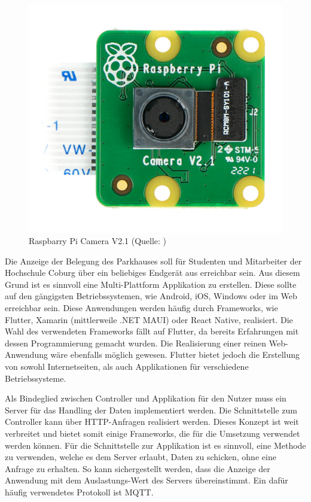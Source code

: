 \begin{figure}[h]
	\myImagePos{}
	\includegraphics[width=0.4\myImageWidth]{Bilder/piCam.jpg}
	\caption[Raspberry Pi Camera V2.1]{Raspbarry Pi Camera V2.1 (Quelle: \cite{PiCamPIC})}
	\label{fig:PiCAM}
\end{figure}

Die Anzeige der Belegung des Parkhauses soll für Studenten und Mitarbeiter der Hochschule Coburg über ein beliebiges Endgerät aus erreichbar sein.
Aus diesem Grund ist es sinnvoll eine Multi-Plattform Applikation zu erstellen.
Diese sollte auf den gängigsten Betriebssystemen, wie Android, iOS, Windows oder im Web erreichbar sein.
Diese Anwendungen werden häufig durch Frameworks, wie Flutter, Xamarin (mittlerweile .NET MAUI) oder React Native, realisiert.
Die Wahl des verwendeten Frameworks fällt auf Flutter, da bereits Erfahrungen mit dessen Programmierung gemacht wurden.
Die Realisierung einer reinen Web-Anwendung wäre ebenfalls möglich gewesen.
Flutter bietet jedoch die Erstellung von sowohl Internetseiten, als auch Applikationen für verschiedene Betriebssysteme.

Als Bindeglied zwischen Controller und Applikation für den Nutzer muss ein Server für das Handling der Daten implementiert werden.
Die Schnittstelle zum Controller kann über HTTP-Anfragen realisiert werden.
Dieses Konzept ist weit verbreitet und bietet somit einige Frameworks, die für die Umsetzung verwendet werden können.
Für die Schnittstelle zur Applikation ist es sinnvoll, eine Methode zu verwenden, welche es dem Server erlaubt, Daten zu schicken, ohne eine Anfrage zu erhalten.
So kann sichergestellt werden, dass die Anzeige der Anwendung mit dem Auslastungs-Wert des Servers übereinstimmt.
Ein dafür häufig verwendetes Protokoll ist MQTT.

